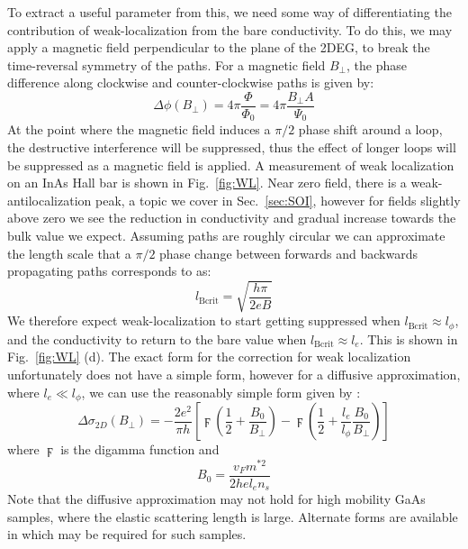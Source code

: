 To extract a useful parameter from this, we need some way of differentiating the contribution of weak-localization from
the bare conductivity. To do this, we may apply a magnetic field perpendicular to the plane of the 2DEG, to break the time-reversal symmetry of the paths. For a magnetic field $B_\perp$, the phase difference along clockwise and counter-clockwise paths
is given by:
\begin{equation}
  \Delta \phi(B_\perp) = 4 \pi \frac{\Phi}{\Phi_0} = 4\pi \frac{B_\perp A}{\Psi_0}
\end{equation}
At the point where the magnetic field induces a $\pi/2$ phase shift around a loop, the destructive interference will be suppressed, thus the
effect of longer loops will be suppressed as a magnetic field is applied. A measurement of weak localization on an InAs Hall bar is shown in
Fig.~\ref{fig:WL}. Near zero field, there is a weak-antilocalization peak, a topic we cover in Sec.~\ref{sec:SOI}, however for fields
slightly above zero we see the reduction in conductivity and gradual increase towards the bulk value we expect.
Assuming paths are roughly circular we can approximate the length scale that a $\pi/2$ phase change between forwards and backwards
propagating paths corresponds to as:
\begin{equation}
  l_\textrm{Bcrit} = \sqrt{\frac{h \pi}{2 e B}}
\end{equation}
We therefore expect weak-localization to start getting suppressed when $l_\textrm{Bcrit} \approx l_\phi$, and the conductivity to return to the bare
value when $l_\textrm{Bcrit} \approx l_e$. This is shown in Fig.~\ref{fig:WL} (d). The exact form for the correction for weak localization unfortunately does not have
a simple form\cite{PhysRevB.70.245311}, however for a diffusive approximation, where $l_e \ll l_\phi$, we can use the reasonably simple form
given by \cite{10.1143/PTP.63.707}:
\begin{equation}
  \Delta \sigma_{2D}(B_\perp) = -\frac{2 e^2}{\pi h}\left[\digamma\left(\frac{1}{2} + \frac{B_0}{B_\perp}\right) - \digamma\left(\frac{1}{2} + \frac{l_e}{l_\phi}\frac{B_0}{B_\perp}\right)\right]
\end{equation}
where $\digamma$ is the digamma function and
\begin{equation}
  B_0 = \frac{v_F m^{*2}}{2 h e l_e n_s}
\end{equation}
Note that the diffusive approximation may not hold for high mobility GaAs samples, where the elastic scattering length is large.
Alternate forms are available in\cite{PhysRevB.70.245311} which may be required for such samples.

